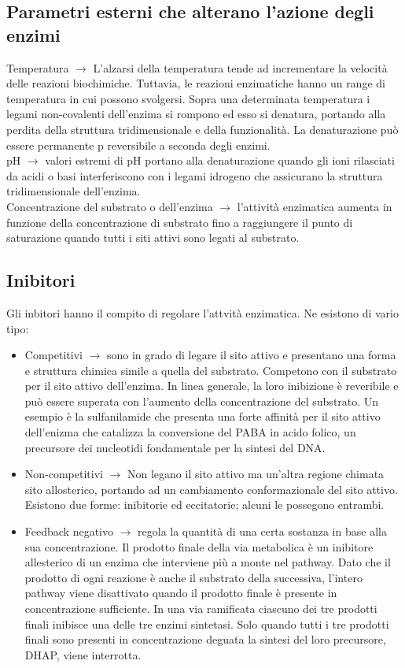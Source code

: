\subsection{Parametri esterni che alterano l'azione degli enzimi}
Temperatura $\xrightarrow{}$ L'alzarsi della temperatura tende ad incrementare la velocit\`a delle reazioni biochimiche. Tuttavia, le reazioni enzimatiche hanno un range di temperatura in cui possono svolgersi. Sopra una determinata temperatura i legami non-covalenti dell'enzima si rompono ed esso si denatura, portando alla perdita della struttura tridimensionale e della funzionalit\`a. La denaturazione pu\`o essere permanente p reversibile a seconda degli enzimi.
\\pH $\xrightarrow{}$ valori estremi di pH portano alla denaturazione quando gli ioni rilasciati da acidi o basi interferiscono con i legami idrogeno che assicurano la struttura tridimensionale dell'enzima.
\\Concentrazione del substrato o dell'enzima $\xrightarrow{}$ l'attivit\`a enzimatica aumenta in funzione della concentrazione di substrato fino a raggiungere il punto di saturazione quando tutti i siti attivi sono legati al substrato.
\subsection{Inibitori}
Gli inbitori hanno il compito di regolare l'attvit\`a enzimatica. Ne esistono di vario tipo:
\begin{itemize}
    \item Competitivi $\xrightarrow{}$ sono in grado di legare il sito attivo e presentano una forma e struttura chimica simile a quella del substrato. Competono con il substrato per il sito attivo dell'enzima. In linea generale, la loro inibizione \`e reveribile e pu\`o essere superata con l'aumento della concentrazione del substrato. Un esempio \`e la sulfanilamide che presenta una forte affinit\`a per il sito attivo dell'enizma che catalizza la conversione del PABA in acido folico, un precursore dei nucleotidi fondamentale per la sintesi del DNA.
    \item Non-competitivi $\xrightarrow{}$ Non legano il sito attivo ma un'altra regione chimata sito allosterico, portando ad un cambiamento conformazionale del sito attivo. Esistono due forme: inibitorie ed eccitatorie; alcuni le possegono entrambi.
    \item Feedback negativo
    $\xrightarrow{}$ regola la quantit\`a di una certa sostanza in base alla sua concentrazione. Il prodotto finale della via metabolica \`e un inibitore allesterico di un enzima che interviene pi\`u a monte nel pathway. Dato che il prodotto di ogni reazione \`e anche il substrato della successiva, l'intero pathway viene disattivato quando il prodotto finale \`e presente in concentrazione sufficiente. In una via ramificata ciascuno dei tre prodotti finali inibisce una delle tre enzimi sintetasi. Solo quando tutti i tre prodotti finali sono presenti in concentrazione deguata la sintesi del loro precursore, DHAP, viene interrotta. 
\end{itemize}

